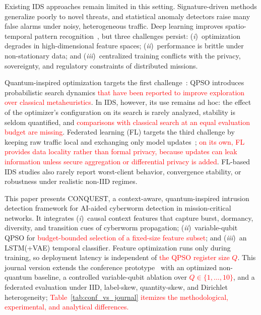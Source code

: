 \documentclass[conference]{IEEEtran}
\begin{document}
Existing IDS approaches remain limited in this setting.
Signature-driven methods generalize poorly to novel threats, and
statistical anomaly detectors raise many false alarms under noisy,
heterogeneous traffic. Deep learning improves spatio-temporal pattern
recognition~\cite{al202}, but three challenges persist:
(\textit{i})~optimization degrades in high-dimensional feature spaces;
(\textit{ii})~performance is brittle under non-stationary data; and
(\textit{iii})~centralized training conflicts with the privacy,
sovereignty, and regulatory constraints of distributed missions.

Quantum-inspired optimization targets the first
challenge~\cite{ajakwe2025eqai,vivekquantum}: QPSO introduces
probabilistic search dynamics \textcolor{red}{that have been reported
to improve exploration over classical metaheuristics}. In IDS,
however, its use remains ad hoc: the effect of the optimizer's
configuration on its search is rarely analyzed, stability is seldom quantified, and
\textcolor{red}{comparisons with classical search at an equal
evaluation budget are missing}. Federated learning (FL) targets the
third challenge by keeping raw traffic local and exchanging only
model updates~\cite{hamadsystematic}; \textcolor{red}{on its
own, FL provides data locality rather than formal privacy, because
updates can leak information unless secure aggregation or
differential privacy is added}. FL-based IDS studies also rarely
report worst-client behavior, convergence stability, or robustness
under realistic non-IID regimes.

This paper presents CONQUEST, a context-aware, quantum-inspired
intrusion detection framework for AI-aided cyberworm detection in
mission-critical networks. It integrates (\textit{i})~causal context
features that capture burst, dormancy, diversity, and transition cues
of cyberworm propagation; (\textit{ii})~variable-qubit QPSO for
\textcolor{red}{budget-bounded selection of a fixed-size
feature subset}; and (\textit{iii})~an LSTM(+VAE) temporal
classifier. Feature optimization runs only during training, so
deployment latency is independent of \textcolor{red}{the
QPSO register size $Q$}. This journal version extends the conference
prototype~\cite{ajakweconquest} with an optimized non-quantum
baseline, a controlled variable-qubit ablation over
\textcolor{red}{$Q\in\{1,\dots,10\}$}, and a federated evaluation
under IID, label-skew, quantity-skew, and Dirichlet heterogeneity;
\textcolor{red}{Table~\ref{tab:conf_vs_journal} itemizes the
methodological, experimental, and analytical differences.}
\end{document}
